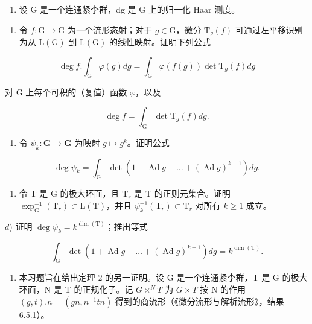 \begin{enumerate}
\def\labelenumi{\arabic{enumi})}
\setcounter{enumi}{7}
\tightlist
\item
  设 G 是一个连通紧李群，dg 是 G 上的归一化 Haar 测度。
\end{enumerate}

\begin{enumerate}
\def\labelenumi{\alph{enumi})}
\tightlist
\item
  令 \(f: \mathrm{G} \to \mathrm{G}\) 为一个流形态射；对于 \(g \in \mathrm{G}\)，微分 \(\mathrm{T}_g(f)\) 可通过左平移识别为从 \(\mathrm{L}(\mathrm{G})\) 到 \(\mathrm{L}(\mathrm{G})\) 的线性映射。证明下列公式
\end{enumerate}

\[
\deg f. \int_ {\mathrm{G}} \varphi (g) d g = \int_ {\mathrm{G}} \varphi (f (g)) \det \mathrm{T} _ {g} (f) d g
\]

对 G 上每个可积的（复值）函数 \(\varphi\)，以及

\[
\deg f = \int_ {\mathrm{G}} \det \mathrm{T} _ {g} (f) d g.
\]

\begin{enumerate}
\def\labelenumi{\alph{enumi})}
\setcounter{enumi}{1}
\tightlist
\item
  令 \(\psi_k: \mathbf{G} \to \mathbf{G}\) 为映射 \(g \mapsto g^k\)。证明公式
\end{enumerate}

\[
\deg \psi_ {k} = \int_ {\mathrm{G}} \det (1 + \operatorname{Ad} g + \dots + (\operatorname{Ad} g) ^ {k - 1}) d g.
\]

\begin{enumerate}
\def\labelenumi{\alph{enumi})}
\setcounter{enumi}{2}
\tightlist
\item
  令 \(\mathrm{T}\) 是 \(\mathrm{G}\) 的极大环面，且 \(\mathrm{T}_r\) 是 \(\mathrm{T}\) 的正则元集合。证明 \(\exp_{\mathrm{G}}^{-1}(\mathrm{T}_r) \subset \mathrm{L}(\mathrm{T})\)，并且 \(\psi_k^{-1}(\mathrm{T}_r) \subset \mathrm{T}_r\) 对所有 \(k \geq 1\) 成立。
\end{enumerate}

\(d\)) 证明 \(\deg \psi_{k} = k^{\dim (\mathrm{T})}\)；推出等式

\[
\int_ {\mathrm{G}} \det (1 + \operatorname{Ad} g + \dots + (\operatorname{Ad} g) ^ {k - 1}) d g = k ^ {\dim (\mathrm{T})}.
\]

\begin{enumerate}
\def\labelenumi{\arabic{enumi})}
\setcounter{enumi}{8}
\tightlist
\item
  本习题旨在给出定理 2 的另一证明。设 G 是一个连通紧李群，T 是 G 的极大环面，N 是 T 的正规化子。记 \(G \times^{N} T\) 为 \(G \times T\) 按 N 的作用 \((g, t).n = (gn, n^{-1}tn)\) 得到的商流形（《微分流形与解析流形》，结果 6.5.1）。
\end{enumerate}

